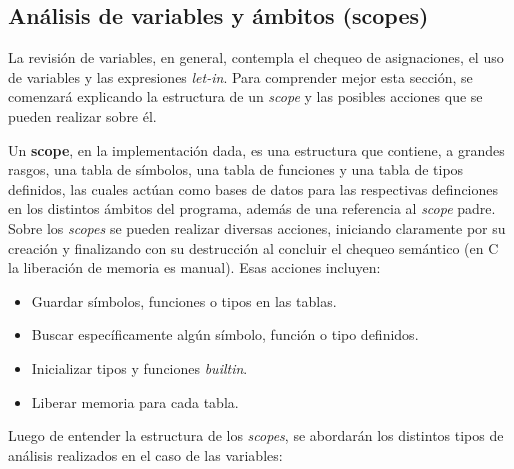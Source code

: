 \documentclass{llncs}
\begin{document}
\subsection{Análisis de variables y ámbitos (scopes)}

La revisión de variables, en general, contempla el chequeo de asignaciones, el uso de variables y
las expresiones \textit{let-in}. Para comprender mejor esta sección, se comenzará explicando la estructura 
de un \textit{scope} y las posibles acciones que se pueden realizar sobre él.

Un \textbf{scope}, en la implementación dada, es una estructura que contiene, a grandes rasgos, una tabla de
símbolos, una tabla de funciones y una tabla de tipos definidos, las cuales actúan como bases de datos para las
respectivas definciones en los distintos ámbitos del programa, además de una referencia al \textit{scope} padre.
Sobre los \textit{scopes} se pueden realizar diversas  acciones, iniciando claramente por su creación y
finalizando con su destrucción al concluir el chequeo semántico (en C la liberación de memoria es manual). Esas
acciones incluyen:
\begin{itemize}
    \item Guardar símbolos, funciones o tipos en las tablas.
    \item Buscar específicamente algún símbolo, función o tipo definidos.
    \item Inicializar tipos y funciones \textit{builtin}.
    \item Liberar memoria para cada tabla.
\end{itemize}

Luego de entender la estructura de los \textit{scopes}, se abordarán los distintos tipos de análisis realizados en el caso 
de las variables: 
\end{document}
